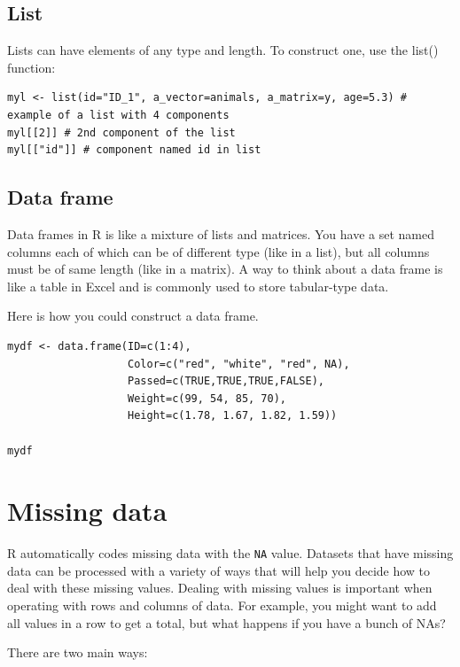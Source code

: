\documentclass[]{book}
\begin{document}
\hypertarget{list}{%
\subsection{List}\label{list}}

Lists can have elements of any type and length. To construct one, use the list() function:

\begin{verbatim}
myl <- list(id="ID_1", a_vector=animals, a_matrix=y, age=5.3) # example of a list with 4 components
myl[[2]] # 2nd component of the list
myl[["id"]] # component named id in list
\end{verbatim}

\hypertarget{data-frame}{%
\subsection{Data frame}\label{data-frame}}

Data frames in R is like a mixture of lists and matrices. You have a set named columns each of which can be of different type (like in a list), but all columns must be of same length (like in a matrix). A way to think about a data frame is like a table in Excel and is commonly used to store tabular-type data.

Here is how you could construct a data frame.

\begin{verbatim}
mydf <- data.frame(ID=c(1:4),
                   Color=c("red", "white", "red", NA),
                   Passed=c(TRUE,TRUE,TRUE,FALSE),
                   Weight=c(99, 54, 85, 70),
                   Height=c(1.78, 1.67, 1.82, 1.59))

mydf
\end{verbatim}

\hypertarget{missing-data}{%
\section{Missing data}\label{missing-data}}

R automatically codes missing data with the \texttt{NA} value. Datasets that have missing data can be processed with a variety of ways that will help you decide how to deal with these missing values. Dealing with missing values is important when operating with rows and columns of data. For example, you might want to add all values in a row to get a total, but what happens if you have a bunch of NAs?

There are two main ways:
\end{document}
